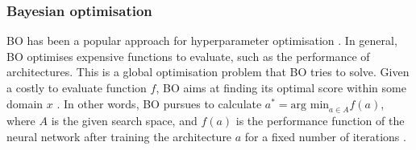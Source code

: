 \subsubsection{Bayesian optimisation}
\Gls{BO} has been a popular approach for hyperparameter optimisation \autocite{elsken2019neural}. In general, \gls{BO} optimises expensive functions to evaluate, such as the performance of architectures. This is a global optimisation problem that \gls{BO} tries to solve. Given a costly to evaluate function $f$, \gls{BO} aims at finding its optimal score within some domain $x$ \autocite{kandasamy2018neural}. In other words, \gls{BO} pursues to calculate $a^* = \text{arg min}_{a \in A} f(a)$, where $A$ is the given search space, and $f(a)$ is the performance function of the neural network after training the architecture $a$ for a fixed number of iterations \autocite{white2021bananas}.  
